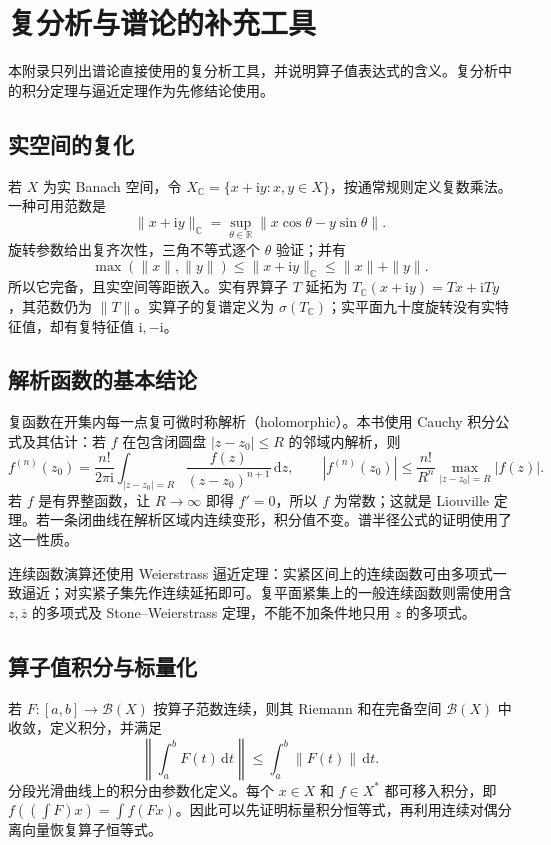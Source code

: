 \documentclass[UTF8,12pt,a4paper,fontset=fandol]{ctexbook}
\begin{document}
\chapter{复分析与谱论的补充工具}
\label{app:fa-complex}

本附录只列出谱论直接使用的复分析工具，并说明算子值表达式的含义。复分析中的积分定理与逼近定理作为先修结论使用。

\section{实空间的复化}
若 $X$ 为实 Banach 空间，令 $X_{\mathbb C}=\{x+\mathrm iy:x,y\in X\}$，按通常规则定义复数乘法。一种可用范数是
\[
 \|x+\mathrm iy\|_{\mathbb C}=
 \sup_{\theta\in\mathbb R}\|x\cos\theta-y\sin\theta\|.
\]
旋转参数给出复齐次性，三角不等式逐个 $\theta$ 验证；并有
\[
 \max(\|x\|,\|y\|)\leq\|x+\mathrm iy\|_{\mathbb C}\leq\|x\|+\|y\|.
\]
所以它完备，且实空间等距嵌入。实有界算子 $T$ 延拓为 $T_{\mathbb C}(x+\mathrm iy)=Tx+\mathrm iTy$，其范数仍为 $\|T\|$。实算子的复谱定义为 $\sigma(T_{\mathbb C})$；实平面九十度旋转没有实特征值，却有复特征值 $\mathrm i,-\mathrm i$。

\section{解析函数的基本结论}
复函数在开集内每一点复可微时称解析（holomorphic）。本书使用 Cauchy 积分公式及其估计：若 $f$ 在包含闭圆盘 $|z-z_0|\leq R$ 的邻域内解析，则
\[
 f^{(n)}(z_0)=\frac{n!}{2\pi\mathrm i}
 \int_{|z-z_0|=R}\frac{f(z)}{(z-z_0)^{n+1}}\,\mathrm dz,
 \qquad |f^{(n)}(z_0)|\leq\frac{n!}{R^n}\max_{|z-z_0|=R}|f(z)|.
\]
若 $f$ 是有界整函数，让 $R\to\infty$ 即得 $f'=0$，所以 $f$ 为常数；这就是 Liouville 定理。若一条闭曲线在解析区域内连续变形，积分值不变。谱半径公式的证明使用了这一性质。

连续函数演算还使用 Weierstrass 逼近定理：实紧区间上的连续函数可由多项式一致逼近；对实紧子集先作连续延拓即可。复平面紧集上的一般连续函数则需使用含 $z,\overline z$ 的多项式及 Stone--Weierstrass 定理，不能不加条件地只用 $z$ 的多项式。

\section{算子值积分与标量化}
若 $F:[a,b]\to\mathcal B(X)$ 按算子范数连续，则其 Riemann 和在完备空间 $\mathcal B(X)$ 中收敛，定义积分，并满足
\[
 \left\|\int_a^bF(t)\,\mathrm dt\right\|\leq\int_a^b\|F(t)\|\,\mathrm dt.
\]
分段光滑曲线上的积分由参数化定义。每个 $x\in X$ 和 $f\in X^*$ 都可移入积分，即 $f((\int F)x)=\int f(Fx)$。因此可以先证明标量积分恒等式，再利用连续对偶分离向量恢复算子恒等式。
\end{document}

